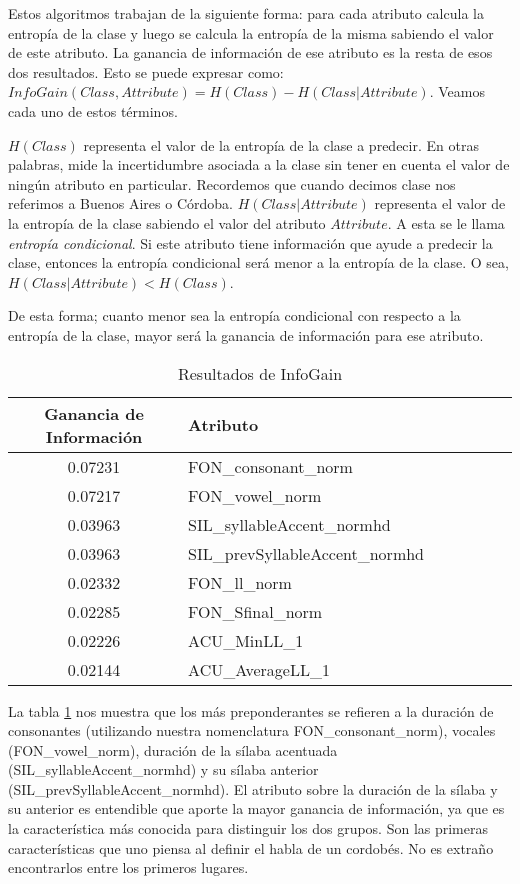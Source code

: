 Estos algoritmos trabajan de la siguiente forma: para cada atributo calcula la entropía de la clase y luego se calcula la entropía de la misma sabiendo el valor de este atributo. La ganancia de información de ese atributo es la resta de esos dos resultados. Esto se puede expresar como: $InfoGain(Class,Attribute) = H(Class) - H(Class | Attribute)$. Veamos cada uno de estos términos.

$H(Class)$ representa el valor de la entropía de la clase a predecir. En otras palabras, mide la incertidumbre asociada a la clase sin tener en cuenta el valor de ningún atributo en particular. Recordemos que cuando decimos clase nos referimos a Buenos Aires o Córdoba. $H(Class | Attribute)$ representa el valor de la entropía de la clase sabiendo el valor del atributo $Attribute$. A esta se le llama \textit{entropía condicional}. Si este atributo tiene información que ayude a predecir la clase, entonces la entropía condicional será menor a la entropía de la clase. O sea, $H(Class | Attribute) < H(Class)$.  

De esta forma; cuanto menor sea la entropía condicional con respecto a la entropía de la clase, mayor será la ganancia de información para ese atributo.

\begin{table}[H]
\centering
\begin{tabular}{|c|l|c|c|c|c|c|}
\hline
\textbf{Ganancia de Información} & \textbf{Atributo} \\ \hline
 0.07231     & FON\_consonant\_norm \\ \hline
 0.07217     & FON\_vowel\_norm \\ \hline
 0.03963     & SIL\_syllableAccent\_normhd \\ \hline
 0.03963     & SIL\_prevSyllableAccent\_normhd \\ \hline
 0.02332     & FON\_ll\_norm \\ \hline
 0.02285     & FON\_Sfinal\_norm \\ \hline
 0.02226     & ACU\_MinLL\_1 \\ \hline
 0.02144     & ACU\_AverageLL\_1 \\ \hline
\end{tabular}
\caption{Resultados de InfoGain}
\label{infogain-table}
\end{table}

La tabla \ref{infogain-table} nos muestra que los más preponderantes se refieren a la duración de consonantes (utilizando nuestra nomenclatura FON\_consonant\_norm), vocales (FON\_vowel\_norm), duración de la sílaba acentuada (SIL\_syllableAccent\_\-normhd) y su sílaba anterior (SIL\_prevSyllableAccent\_normhd). El atributo sobre la duración de la sílaba y su anterior es entendible que aporte la mayor ganancia de información, ya que es la característica más conocida para distinguir los dos grupos. Son las primeras características que uno piensa al definir el habla de un cordobés. No es extraño encontrarlos entre los primeros lugares. 

